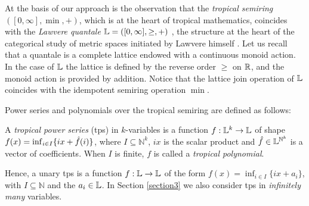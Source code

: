 %



At the basis of our approach is the observation that the \emph{tropical semiring} $([0,\infty], \min, +)$, which is at the heart of tropical mathematics, coincides with the \emph{Lawvere quantale} $\mathbb{L}=([0,\infty], \geq, +)$ \cite{Hofmann2014, Stubbe2014}, the structure at the heart of the categorical study of metric spaces initiated by Lawvere himself \cite{Lawvere1973}.
Let us recall that a quantale is a complete lattice endowed with a continuous monoid action. In the case of $\mathbb{L}$ the lattice is defined by the reverse order $\geq$ on $\mathbb{R}$, and the monoid action is provided by addition. Notice that the lattice join operation of $\mathbb{L}$ coincides with the idempotent semiring operation $\min$. 




Power series and polynomials over the tropical semiring are defined as follows:


\begin{definition}
A \emph{tropical power series} (tps) 
in $k$-variables is a function $f:\mathbb{L}^k\to\mathbb{L}$ of shape $f(x)=\inf_{i\in I}\{ix + \hat{f}(i) \}$, where 
$I\subseteq\mathbb N^{k}$, $i x$ is the scalar product and $\hat{f}\in \mathbb{L}^{{\mathbb N}^{k}}$ is a vector of coefficients.
When $I$ is finite, $f$ is called a \emph{tropical polynomial}. 
\end{definition}
Hence, a unary tps is a function $f:\mathbb{L}\to \mathbb{L}$ of the form $f(x)=\inf_{i\in I}\{ix+a_{i}\}$, with $I\subseteq\mathbb N$ and the $a_{i}\in \mathbb{L}$.
In Section \ref{section3} we also consider tps in \emph{infinitely many} variables.

